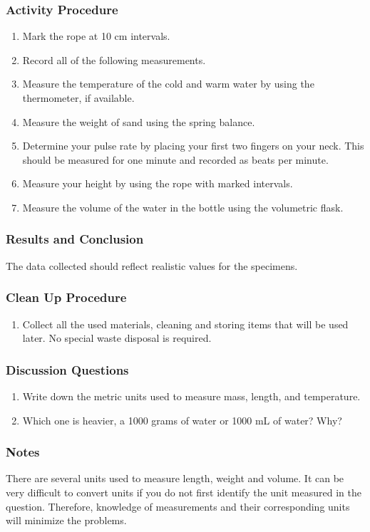 \subsubsection*{Activity Procedure}
\begin{enumerate}
\item{Mark the rope at 10 cm intervals.}
\item{Record all of the following measurements.}
\item{Measure the temperature of the cold and warm water by using the thermometer, if available.}
\item{Measure the weight of sand using the spring balance.}
\item{Determine your pulse rate by placing your first two fingers on your neck. This should be measured for one minute and recorded as beats per minute.}
\item{Measure your height by using the rope with marked intervals.}
\item{Measure the volume of the water in the bottle using the volumetric flask.}
\end{enumerate}

\subsubsection*{Results and Conclusion}
The data collected should reflect realistic values for the specimens. 

\subsubsection*{Clean Up Procedure}
\begin{enumerate}
\item{Collect all the used materials, cleaning and storing items that will be used later. No special waste disposal is required.}
\end{enumerate}

\subsubsection*{Discussion Questions}
\begin{enumerate}
\item{Write down the metric units used to measure mass, length, and temperature.}
\item{Which one is heavier, a 1000 grams of water or 1000 mL of water? Why?}
\end{enumerate}

\subsubsection*{Notes}
There are several units used to measure length, weight and volume. It can be very difficult to convert units if you do not first identify the unit measured in the question. Therefore, knowledge of measurements and their corresponding units will minimize the problems.